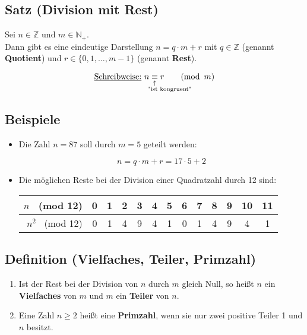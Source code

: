 \subsection[Division mit Rest]{Satz (Division mit Rest)}

	Sei $n\in\mathbb{Z}$ und $m\in\mathbb{N_+}$.\\
	Dann gibt es eine eindeutige Darstellung
	$n=q\cdot m+r$ mit $q\in \mathbb{Z}$ (genannt \textbf{Quotient})
	und $r\in\{0,1,\dots,m-1\}$ (genannt \textbf{Rest}).
	
	\[	
		\text{\underline{Schreibweise:} }n\equalexpl{"ist kongruent"}r
		\qquad(\operatorname{mod}~m)		
	\]

	
\subsection{Beispiele}
	
	\begin{itemize}

		\item Die Zahl $n=87$ soll durch $m=5$ geteilt werden:
		
		\[
			n=q\cdot m+r=17\cdot 5+2
		\]			
		
		\item Die möglichen Reste bei der Division einer Quadratzahl durch 12 sind:\\
		
		\begin{tabular}{r|c|c|c|c|c|c|c|c|c|c|c|c|}
		$n$ \ (mod 12)		& 0 & 1 & 2 & 3 & 4 & 5 & 6 & 7 & 8 & 9 & 10 & 11 \\ \hline
		$n^2$ \ (mod 12)	& 0 & 1 & 4 & 9 & 4 & 1 & 0 & 1 & 4 & 9 & 4  & 1
		\end{tabular}
	
	\end{itemize}

	
\subsection[Vielfaches, Teiler, Primzahl]{Definition (Vielfaches, Teiler, Primzahl)}

	\begin{enumerate}
		
		\item Ist der Rest bei der Division von $n$ durch $m$ gleich Null, 
		so heißt $n$ ein \textbf{Vielfaches} von $m$ und $m$ ein \textbf{Teiler} von $n$.
		
		\item Eine Zahl $n\geq 2$ heißt eine \textbf{Primzahl}, wenn sie nur 
		zwei positive Teiler 1 und $n$ besitzt.
		
	\end{enumerate}


